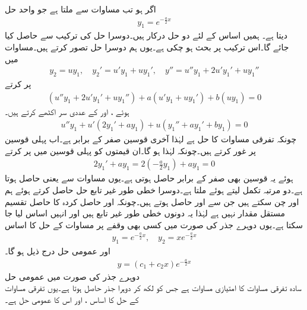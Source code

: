 اگر  ہو تب مساوات  سے  ملتا ہے جو واحد حل
\begin{align*}
y_1=e^{-\frac{a}{2}x}
\end{align*}
دیتا ہے۔ ہمیں اساس کے لئے دو حل درکار ہیں۔دوسرا حل  کی ترکیب سے حاصل کیا جائے گا۔اس ترکیب پر بحث ہو چکی ہے۔یوں ہم دوسرا حل  تصور کرتے ہیں۔مساوات  میں
\begin{align*}
y_2=uy_1,\quad y_2'=u'y_1+uy_1',\quad y''=u''y_1+2u'y_1'+uy_1''
\end{align*}
پر کرتے
\begin{align*}
(u''y_1+2u'y_1'+uy_1'')+a(u'y_1+uy_1')+b(uy_1)=0
\end{align*}
ہوئے ،  اور  کے عددی سر اکٹھے کرتے ہیں۔
\begin{align}\label{مساوات_سادہ_دو_درجی_دوہرا_جذر_الف}
u'' y_1+u'(2y_1'+ay_1)+u(y_1''+ay_1'+by_1)=0
\end{align}
چونکہ  تفرقی مساوات کا حل ہے لہٰذا آخری قوسین صفر کے برابر  ہے۔اب پہلی قوسین پر غور کرتے ہیں۔چونکہ  لہٰذا  ہو گا۔ان قیمتوں کو پہلی قوسین میں پر کرتے
\begin{align*}
2y_1'+ay_1=2(-\frac{a}{2}y_1)+ay_1=0
\end{align*}
ہوئے یہ قوسین بھی صفر کے برابر حاصل ہوتی ہے۔یوں مساوات  سے  یعنی  حاصل ہوتا ہے۔دو مرتبہ تکمل لیتے ہوئے  ملتا ہے۔دوسرا خطی طور غیر تابع حل  حاصل کرتے ہوئے ہم  اور  چن سکتے ہیں جن سے
  اور  حاصل ہوتے ہیں۔چونکہ  اور حاصل کردہ  کا حاصل تقسیم مستقل مقدار نہیں ہے لہٰذا یہ دونوں خطی طور غیر تابع ہیں اور انہیں اساس لیا جا سکتا ہے۔یوں دوہرے جذر کی صورت میں کسی بھی وقفے پر مساوات  کے حل کا اساس 
\begin{align*}
y_1=e^{-\frac{a}{2}x}, \quad y_2=xe^{-\frac{a}{2}x}
\end{align*}
اور عمومی حل درج ذیل ہو گا۔
\begin{align}
y=(c_1 +c_2 x)e^{-\frac{a}{2}x}
\end{align}
\quad دوہرے جذر کی صورت میں عمومی حل\\
سادہ تفرقی مساوات  کا امتیازی مساوات  ہے جس کو  لکھ کر دوہرا جذر  حاصل ہوتا ہے۔یوں تفرقی مساوات کے حل کا اساس ،  اور اس کا عمومی حل  ہے۔

